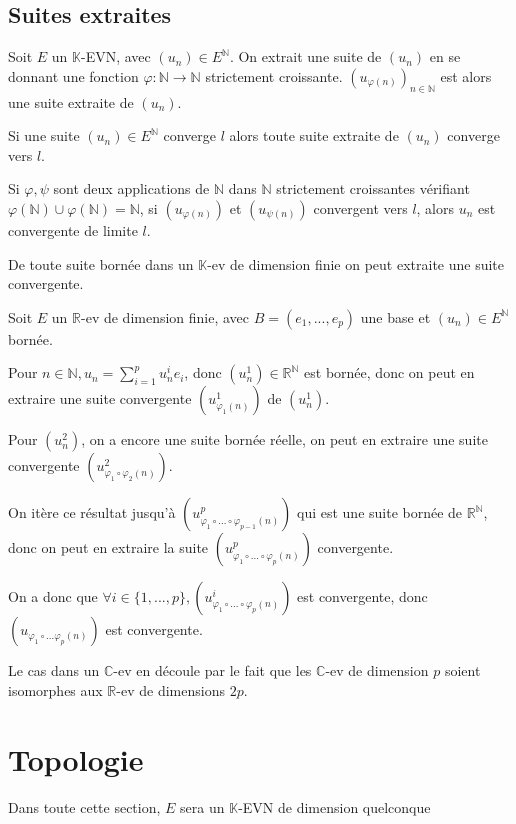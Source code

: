 \documentclass[a4paper,12pt]{book}
\newcommand{\Def}[2]{\begin{tcolorbox}[sharp corners, colback=white,colframe=blue!90!black!75, title=Définition : #1]#2\end{tcolorbox}}
\newcommand{\Thr}[2]{\begin{tcolorbox}[sharp corners, colback=white,colframe=red!90!black!75, title=Théorème : #1]#2\end{tcolorbox}}
\newcommand{\Pre}[1]{\begin{tcolorbox}[sharp corners, colback=white,colframe=green!60!green!30!black!75, title=Preuve]#1\end{tcolorbox}}
\def\R{\mathbb{R}}
\def\C{\mathbb{C}}
\def\N{\mathbb{N}}
\def\K{\mathbb{K}}
\begin{document}
\subsection{Suites extraites}
\Def{Suites extraites}{Soit $E$ un $\K$-EVN, avec $(u_n)\in E^\N$. On extrait une suite de $(u_n)$ en se donnant une fonction $\varphi:\N\to\N$ strictement croissante. $(u_{\varphi(n)})_{n\in\N}$ est alors une suite extraite de $(u_n)$.}
\Thr{Convergence des suites extraites}{Si une suite $(u_n)\in E^\N$ converge $l$ alors toute suite extraite de $(u_n)$ converge vers $l$.}
\Thr{Union d'applications d'extraction}{Si $\varphi, \psi$ sont deux applications de $\N$ dans $\N$ strictement croissantes vérifiant $\varphi(\N)\cup\varphi(\N)=\N$, si $(u_{\varphi(n)})$ et $(u_{\psi(n)})$ convergent vers $l$, alors $u_n$ est convergente de limite $l$.}
\Thr{Bolzano-Weierstrass}{De toute suite bornée dans un $\K$-ev de dimension finie on peut extraite une suite convergente.}
\Pre{Soit $E$ un $\R$-ev de dimension finie, avec $B=(e_1,...,e_p)$ une base et $(u_n)\in E^\N$ bornée.
\par Pour $n\in\N, u_n=\sum\limits_{i=1}^pu_n^ie_i$, donc $(u_n^1)\in\R^\N$ est bornée, donc on peut en extraire une suite convergente $(u_{\varphi_1(n)}^1)$ de $(u_n^1)$.
\par Pour $(u_n^2)$, on a encore une suite bornée réelle, on peut en extraire une suite convergente $(u_{\varphi_1\circ\varphi_2(n)}^2)$.
\par On itère ce résultat jusqu'à $(u_{\varphi_1\circ...\circ\varphi_{p-1}(n)}^p)$ qui est une suite bornée de $\R^\N$, donc on peut en extraire la suite $(u_{\varphi_1\circ...\circ\varphi_p(n)}^p)$ convergente.
\par On a donc que $\forall i\in\{1,...,p\}, (u_{\varphi_1\circ...\circ\varphi_p(n)}^i)$ est convergente, donc $(u_{\varphi_1\circ...\varphi_p(n)})$ est convergente.
\par Le cas dans un $\C$-ev en découle par le fait que les $\C$-ev de dimension $p$ soient isomorphes aux $\R$-ev de dimensions $2p$. }


\section{Topologie}
Dans toute cette section, $E$ sera un $\K$-EVN de dimension quelconque
\end{document}
